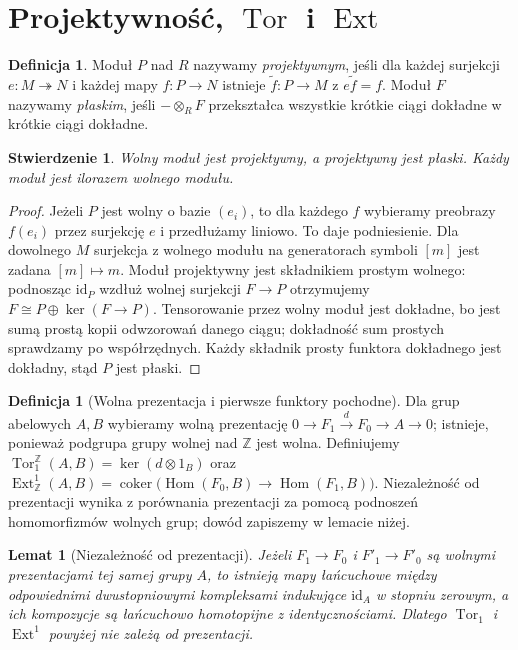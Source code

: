 \documentclass[11pt,a4paper,oneside]{report}
\newcommand{\Z}{\mathbb{Z}}
\newcommand{\id}{\mathrm{id}}
\theoremstyle{plain}
\newtheorem{lemat}[twierdzenie]{Lemat}
\newtheorem{stwierdzenie}[twierdzenie]{Stwierdzenie}
\theoremstyle{definition}
\newtheorem{definicja}[twierdzenie]{Definicja}
\theoremstyle{remark}
\begin{document}
\section{Projektywność, \texorpdfstring{$\operatorname{Tor}$ i $\operatorname{Ext}$}{Tor i Ext}}
\begin{definicja}
Moduł $P$ nad $R$ nazywamy \emph{projektywnym}, jeśli dla
każdej surjekcji $e:M\twoheadrightarrow N$ i każdej mapy
$f:P\to N$ istnieje $\widetilde f:P\to M$ z
$e\widetilde f=f$. Moduł $F$ nazywamy \emph{płaskim}, jeśli
$-\otimes_RF$ przekształca wszystkie krótkie ciągi dokładne
w krótkie ciągi dokładne.
\end{definicja}
\begin{stwierdzenie}
Wolny moduł jest projektywny, a projektywny jest płaski.
Każdy moduł jest ilorazem wolnego modułu.
\end{stwierdzenie}
\begin{proof}
Jeżeli $P$ jest wolny o bazie $(e_i)$, to dla każdego $f$
wybieramy preobrazy $f(e_i)$ przez surjekcję $e$ i przedłużamy
liniowo. To daje podniesienie. Dla dowolnego $M$ surjekcja
z wolnego modułu na generatorach symboli $[m]$ jest zadana
$[m]\mapsto m$. Moduł projektywny jest składnikiem prostym
wolnego: podnosząc $\id_P$ wzdłuż wolnej surjekcji $F\to P$
otrzymujemy $F\cong P\oplus\ker(F\to P)$.
Tensorowanie przez wolny moduł jest dokładne, bo jest sumą
prostą kopii odwzorowań danego ciągu; dokładność sum prostych
sprawdzamy po współrzędnych. Każdy składnik prosty funktora
dokładnego jest dokładny, stąd $P$ jest płaski.
\end{proof}
\begin{definicja}[Wolna prezentacja i pierwsze funktory pochodne]
Dla grup abelowych $A,B$ wybieramy wolną prezentację
$0\to F_1\xrightarrow{d}F_0\to A\to0$; istnieje, ponieważ
podgrupa grupy wolnej nad $\Z$ jest wolna. Definiujemy
$\operatorname{Tor}_1^{\Z}(A,B)=\ker(d\otimes1_B)$ oraz
$\operatorname{Ext}^1_{\Z}(A,B)=\operatorname{coker}
\bigl(\operatorname{Hom}(F_0,B)\to\operatorname{Hom}(F_1,B)\bigr)$.
Niezależność od prezentacji wynika z porównania prezentacji
za pomocą podnoszeń homomorfizmów wolnych grup; dowód
zapiszemy w lemacie niżej.
\end{definicja}
\begin{lemat}[Niezależność od prezentacji]
Jeżeli $F_1\to F_0$ i $F'_1\to F'_0$ są wolnymi prezentacjami
tej samej grupy $A$, to istnieją mapy łańcuchowe między
odpowiednimi dwustopniowymi kompleksami indukujące
$\id_A$ w stopniu zerowym, a ich kompozycje są łańcuchowo
homotopijne z identycznościami. Dlatego $\operatorname{Tor}_1$
i $\operatorname{Ext}^1$ powyżej nie zależą od prezentacji.
\end{lemat}
\end{document}
